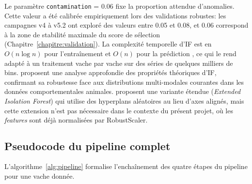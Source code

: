 Le paramètre \texttt{contamination} = 0.06 fixe la proportion attendue d'anomalies. Cette
valeur a été calibrée empiriquement lors des validations robustes: les campagnes v4 à v5.2
ont exploré des valeurs entre 0.05 et 0.08, et 0.06 correspond à la zone de stabilité
maximale du score de sélection (Chapitre~\ref{chapitre:validation}). La complexité
temporelle d'IF est en $O(n \log n)$ pour l'entraînement et $O(n)$ pour la prédiction
\citep{liu2008isolation}, ce qui le rend adapté à un traitement vache par vache sur des
séries de quelques milliers de bins. \cite{liu2012isolation_extended} proposent une
analyse approfondie des propriétés théoriques d'IF, confirmant sa robustesse face aux
distributions multi-modales courantes dans les données comportementales animales.
\cite{hariri2021extended} proposent une variante étendue (\textit{Extended Isolation
Forest}) qui utilise des hyperplans aléatoires au lieu d'axes alignés, mais cette
extension n'est pas nécessaire dans le contexte du présent projet, où les \textit{features} sont
déjà normalisées par RobustScaler.

\subsection{Pseudocode du pipeline complet}
L'algorithme~\ref{alg:pipeline} formalise l'enchaînement des quatre étapes du pipeline
pour une vache donnée.

